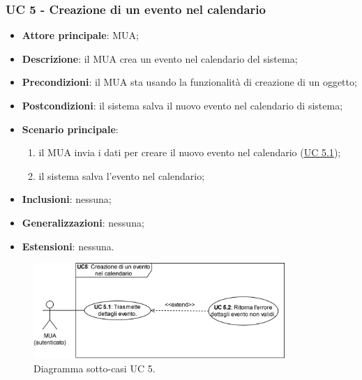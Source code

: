 \subsubsection{UC 5 - Creazione di un evento nel calendario} \label{sec:UC5}
    \begin{itemize}
        \item \textbf{Attore principale}: MUA;
        \item \textbf{Descrizione}: il MUA crea un evento nel calendario del sistema;
        \item \textbf{Precondizioni}: il MUA sta usando la funzionalità di creazione di un oggetto;
        \item \textbf{Postcondizioni}: il sistema salva il nuovo evento nel calendario di sistema;
        \item \textbf{Scenario principale}:
            \begin{enumerate}
                \item il MUA invia i dati per creare il nuovo evento nel calendario (\hyperref[sec:UC5.1]{UC 5.1});
                \item il sistema salva l'evento nel calendario;
            \end{enumerate}
        \item \textbf{Inclusioni}: nessuna;
        \item \textbf{Generalizzazioni}: nessuna;
        \item \textbf{Estensioni}: nessuna.
    \end{itemize}

\begin{figure}[h]
    \includegraphics[width=0.85\textwidth]{sections/uc_imgs/UC05.X.png}
    \centering
    \caption{Diagramma sotto-casi UC 5.}
\end{figure}

